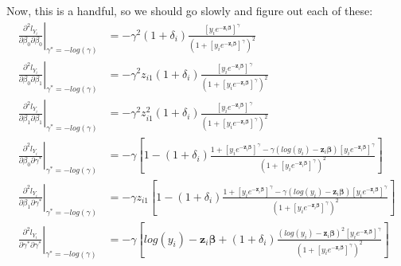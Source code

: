 \documentclass[]{article}
\begin{document}
Now, this is a handful, so we should go slowly and figure out each of these: 
  $$
  \begin{aligned}
    \left. \frac{\partial^2 l_{Y_i}}{ \partial \beta_0\partial \beta_0}  \right|_{\gamma^* = -log(\gamma)} &= - \gamma^2(1+\delta_i)  \frac{  \left[y_i e^{-\pmb{z}_i\pmb{\beta}}\right]^{ \gamma}   }{  \left( 1 +  \left[y_i e^{-\pmb{z}_i\pmb{\beta}}\right]^{ \gamma} \right)^2  } \\
    \left. \frac{\partial^2 l_{Y_i}}{ \partial \beta_0\partial \beta_1}  \right|_{\gamma^* = -log(\gamma)} &= - \gamma^2 z_{i1} (1+\delta_i)  \frac{  \left[y_i e^{-\pmb{z}_i\pmb{\beta}}\right]^{ \gamma}   }{   \left( 1 + \left[y_i e^{-\pmb{z}_i\pmb{\beta}}\right]^{ \gamma} \right)^2  } \\
    \left. \frac{\partial^2 l_{Y_i}}{ \partial \beta_1\partial \beta_1}  \right|_{\gamma^* = -log(\gamma)} &= - \gamma^2  z_{i1}^2 (1+\delta_i)  \frac{  \left[y_i e^{-\pmb{z}_i\pmb{\beta}}\right]^{ \gamma}   }{   \left(1 +  \left[y_i e^{-\pmb{z}_i\pmb{\beta}}\right]^{ \gamma} \right)^2  } \\
    \left. \frac{\partial^2 l_{Y_i}}{ \partial \beta_0\partial \gamma^*}  \right|_{\gamma^* = -log(\gamma)} &= - \gamma   \left[   1 -   (1+\delta_i)  \frac{   1 +   \left[y_i e^{-\pmb{z}_i\pmb{\beta}}\right]^{ \gamma}     -\gamma \left( log(y_i) - \pmb{z}_i\pmb{\beta} \right)\left[y_i e^{-\pmb{z}_i\pmb{\beta}}\right]^{ \gamma} }{  \left( 1+\left[y_i e^{-\pmb{z}_i\pmb{\beta}}\right]^{ \gamma} \right)^2  }  \right]\\
    \left. \frac{\partial^2 l_{Y_i}}{ \partial \beta_1\partial \gamma^*}  \right|_{\gamma^* = -log(\gamma)} &= - \gamma  z_{i1}  \left[   1 -   (1+\delta_i)  \frac{   1 +   \left[y_i e^{-\pmb{z}_i\pmb{\beta}}\right]^{ \gamma}     -\gamma \left( log(y_i) - \pmb{z}_i\pmb{\beta} \right)\left[y_i e^{-\pmb{z}_i\pmb{\beta}}\right]^{ \gamma} }{  \left( 1+\left[y_i e^{-\pmb{z}_i\pmb{\beta}}\right]^{ \gamma} \right)^2  }  \right]\\
    \left. \frac{\partial^2 l_{Y_i}}{ \partial  \gamma^*  \partial \gamma^*}  \right|_{\gamma^* = -log(\gamma)} &= - \gamma   \left[   log(y_i)  -  \pmb{z}_i\pmb{\beta} +  (1+\delta_i)  \frac{   \left( log(y_i) - \pmb{z}_i\pmb{\beta} \right)^2  \left[y_i e^{-\pmb{z}_i\pmb{\beta}}\right]^{ \gamma} }{  \left( 1+\left[y_i e^{-\pmb{z}_i\pmb{\beta}}\right]^{ \gamma} \right)^2  }  \right]\\
  \end{aligned}
  $$
    
\end{document}
